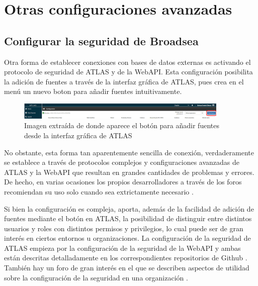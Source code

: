 
\section{Otras configuraciones avanzadas} \label{sec:04ConfigAvanzada}

\subsection{Configurar la seguridad de Broadsea} \label{subsec:04Seguridad}

Otra forma de establecer conexiones con bases de datos externas es activando el protocolo de seguridad de ATLAS y de la WebAPI. Esta configuración posibilita la adición de fuentes a través de la interfaz gráfica de ATLAS, pues crea en el menú  un nuevo boton para añadir fuentes intuitivamente. 

\begin{figure}[H]
    \centering
    \includegraphics[width=0.90\textwidth]{figures/capNewSource.png}
    \caption{Imagen extraída de \cite{forumAddMSDB} donde aparece el botón para añadir fuentes desde la interfaz gráfica de ATLAS}
    \label{fig:capNewSource}
\end{figure}

No obstante, esta forma tan aparentemente sencilla de conexión, verdaderamente se establece a través de protocolos complejos y configuraciones avanzadas de ATLAS y la WebAPI que resultan en grandes cantidades de problemas y errores. De hecho, en varias ocasiones los propios desarrolladores a través de los foros recomiendan su uso solo cuando sea extrictamente necesario \cite{forumAddMSDB}\cite{forumAddSecurityAtlas}.

Si bien la configuración es compleja, aporta, además de la facilidad de adición de fuentes mediante el botón en ATLAS, la posibilidad de distinguir entre distintos usuarios y roles con distintos permisos y privilegios, lo cual puede ser de gran interés en ciertos entornos u organizaciones.  La configuración de la seguridad de ATLAS empieza por la configuración de la seguridad de la WebAPI y ambas están descritas detalladamente en los correspondientes repositorios de Github \cite{githubWASecurity}\cite{githubATSecurity}. También hay un foro de gran interés en el que se describen aspectos de utilidad sobre la configuración de la seguridad en una organización \cite{forumAddSecurityAtlas}.


